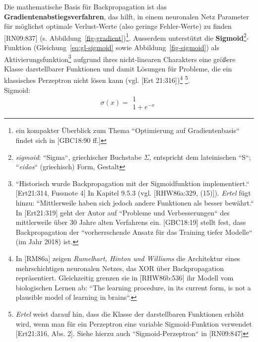 Die mathematische Basis für Backpropagation ist das \textbf{Gradientenabstiegsverfahren}, das hilft, in einem neuronalen Netz Parameter für möglichst optimale Verlust-Werte (also geringe Fehler-Werte) zu finden [RN09:837] (s. Abbildung~\ref{fig-gradient})\footnote{
    ein kompakter Überblick zum Thema ``Optimierung auf Gradientenbasis`` findet sich in [GBC18:90 ff.]
}.  Ausserdem unterstützt die \textbf{Sigmoid}\footnote{
    \textit{sigmoid}: ``Sigma``, griechischer Buchstabe $\Sigma$, entspricht dem lateinischen ``S``; ``\textit{eidos}`` (griechisch) Form, Gestalt
}-Funktion (Gleichung~\ref{eq:gl-sigmoid} sowie Abbildung~\ref{fig-sigmoid}) als Aktivierungsfunktion\footnote{ ``Historisch wurde Backpropagation mit der Sigmoidfunktion implementiert.`` [Ert21:314, Fussnote 4] In Kapitel 9.5.3 (vgl. [RHW86a:329, (15)]). \textit{Ertel} fügt hinzu: ``Mittlerweile haben sich jedoch andere Funktionen als besser bewährt.`` In [Ert21:319] geht der Autor auf ``Probleme und Verbesserungen`` des mittlerweile über 30 Jahre alten Verfahrens ein. [GBC18:19]  stellt fest, dass Backpropagation der ``vorherrschende Ansatz für das Training tiefer Modelle`` (im Jahr 2018) ist.
}  aufgrund ihres nicht-linearen Charakters eine größere Klasse darstellbarer Funktionen und damit Lösungen für Probleme, die ein klassisches Perzeptron nicht lösen kann (vgl. [Ert 21:316])\footnote{
    In [RM86a] zeigen \textit{Rumelhart, Hinton und Williams} die Architektur eines mehrschichtigen neuronalen Netzes, das XOR über Backpropagation repräsentiert. Gleichzeitig grenzen sie in [RHW86b:536] ihr Modell vom biologischen Lernen ab: ``The learning procedure, in its current form, is not a plausible model of learning in brains``.
} \footnote{
    \textit{Ertel} weist darauf hin, dass die Klasse der darstellbaren Funktionen erhöht wird, wenn man für ein Perzeptron eine variable Sigmoid-Funktion verwendet [Ert21:316, Abs. 2]. Siehe hierzu auch ``Sigmoid-Perzeptron`` in [RN09:847]
}.\\

Sigmoid:
\begin{equation}
\sigma(x) = \begin{matrix}1 \\ \hline 1 + e^{-x}\end{matrix}
\label{eq:gl-sigmoid}
\end{equation}



